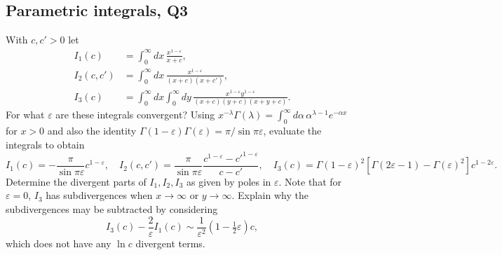 \subsection{Parametric integrals, Q3}
With $c, c' > 0$ let
\begin{align}
    I_1(c) &= \int_0^\infty dx\,\frac{x^{1-\varepsilon}}{x+c}, \\
    I_2(c,c') &= \int_0^\infty dx\,\frac{x^{1-\varepsilon}}{(x+c)(x+c')}, \\
    I_3(c) &= \int_0^\infty dx\int_0^\infty dy\,\frac{x^{1-\varepsilon}y^{1-\varepsilon}}{(x+c)(y+c)(x+y+c)}.
\end{align}
For what $\varepsilon$ are these integrals convergent? Using $x^{-\lambda}\Gamma(\lambda) = \int_0^\infty d\alpha\,\alpha^{\lambda-1}e^{-\alpha x}$ for $x>0$ and also the identity $\Gamma(1-\varepsilon)\Gamma(\varepsilon) = \pi/\sin\pi\varepsilon$, evaluate the integrals to obtain
\begin{equation}
    I_1(c) = -\frac{\pi}{\sin\pi\varepsilon}c^{1-\varepsilon}, \quad
    I_2(c,c') = \frac{\pi}{\sin\pi\varepsilon}\frac{c^{1-\varepsilon}-c'^{1-\varepsilon}}{c-c'}, \quad
    I_3(c) = \Gamma(1-\varepsilon)^2\!\left[\Gamma(2\varepsilon-1)-\Gamma(\varepsilon)^2\right]c^{1-2\varepsilon}.
\end{equation}
Determine the divergent parts of $I_1, I_2, I_3$ as given by poles in $\varepsilon$. Note that for $\varepsilon = 0$, $I_3$ has subdivergences when $x\to\infty$ or $y\to\infty$. Explain why the subdivergences may be subtracted by considering
\begin{equation}
    I_3(c) - \frac{2}{\varepsilon}I_1(c) \sim \frac{1}{\varepsilon^2}\!\left(1 - \tfrac{1}{2}\varepsilon\right)c,
\end{equation}
which does not have any $\ln c$ divergent terms.
